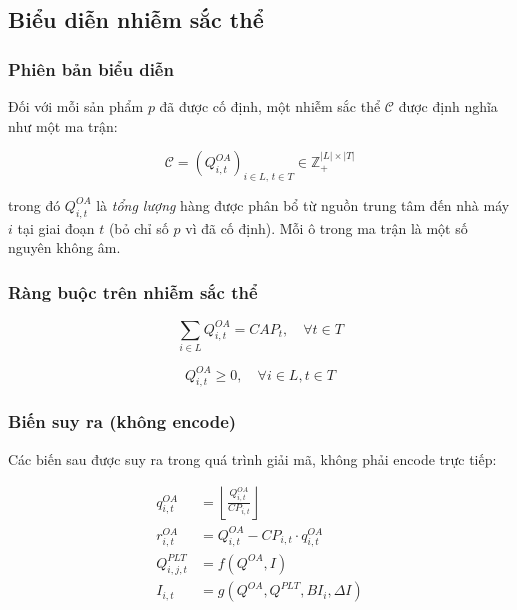 \documentclass[12pt]{article}
\newcommand{\QOA}{Q^{OA}}
\newcommand{\QPLT}{Q^{PLT}}
\newcommand{\qOA}{q^{OA}}
\newcommand{\rOA}{r^{OA}}
\begin{document}
\subsection{Biểu diễn nhiễm sắc thể}

\subsubsection{Phiên bản biểu diễn}

Đối với mỗi sản phẩm $p$ đã được cố định, một nhiễm sắc thể $\mathcal{C}$ được định nghĩa như một ma trận:

\begin{equation}
  \mathcal{C} = \left(\QOA_{i,t}\right)_{i \in L,\, t \in T}
  \in \mathbb{Z}_+^{|L| \times |T|}
\end{equation}

trong đó $\QOA_{i,t}$ là \emph{tổng lượng} hàng được phân bổ từ nguồn trung tâm đến nhà máy $i$ tại giai đoạn $t$ (bỏ chỉ số $p$ vì đã cố định). Mỗi ô trong ma trận là một số nguyên không âm.

\subsubsection{Ràng buộc trên nhiễm sắc thể}

\begin{equation}
  \sum_{i \in L} \QOA_{i,t} = CAP_t, \quad \forall t \in T
  \tag{Ràng buộc năng lực -- cứng}
\end{equation}

\begin{equation}
  \QOA_{i,t} \geq 0, \quad \forall i \in L, t \in T
\end{equation}

\subsubsection{Biến suy ra (không encode)}

Các biến sau được suy ra trong quá trình giải mã, không phải encode trực tiếp:

\begin{align}
  \qOA_{i,t} &= \left\lfloor \frac{\QOA_{i,t}}{CP_{i,t}} \right\rfloor
  \tag{số case đầy đủ}\\[4pt]
  \rOA_{i,t} &= \QOA_{i,t} - CP_{i,t} \cdot \qOA_{i,t}
  \tag{phần dư OA}\\[4pt]
  \QPLT_{i,j,t} &= f(\QOA, I)
  \tag{suy ra từ trạng thái tồn kho}\\[4pt]
  I_{i,t} &= g(\QOA, \QPLT, BI_i, \Delta I)
  \tag{cân bằng tồn kho}
\end{align}
\end{document}
